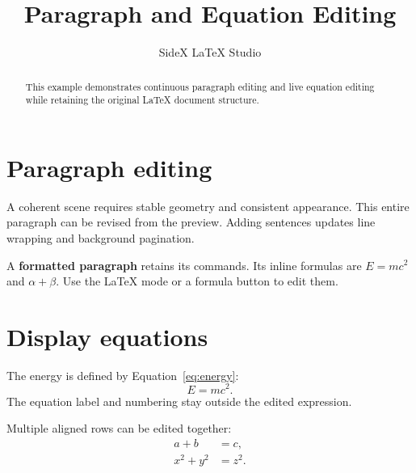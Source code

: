 \documentclass[11pt,a4paper]{article}
\title{Paragraph and Equation Editing}
\author{SideX LaTeX Studio}
\date{}
\begin{document}
\maketitle
\begin{abstract}
This example demonstrates continuous paragraph editing and live equation editing while retaining the original LaTeX document structure.
\end{abstract}
\section{Paragraph editing}
A coherent scene requires stable geometry and consistent appearance. This entire paragraph can be revised from the preview. Adding sentences updates line wrapping and background pagination.

A \textbf{formatted paragraph} retains its commands. Its inline formulas are $E=mc^2$ and \(\alpha+\beta\). Use the LaTeX mode or a formula button to edit them.
\section{Display equations}
The energy is defined by Equation~\ref{eq:energy}:
\begin{equation}\label{eq:energy}
  E = mc^2.
\end{equation}
The equation label and numbering stay outside the edited expression.

Multiple aligned rows can be edited together:
\begin{align}
  a + b &= c, \\
  x^2 + y^2 &= z^2.
\end{align}
\end{document}
